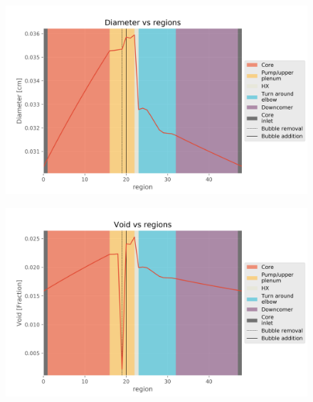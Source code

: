 \begin{figure}[ht] 
\centering
\begin{minipage}{.5\textwidth}
  \centering
  \includegraphics[width=1.0\linewidth]{images/BaseCaseDiameter.png}
  \label{fig:BaseCaseDia}
\end{minipage}%
\begin{minipage}{.5\textwidth}
  \centering
  \includegraphics[width=1.0\linewidth]{images/BaseCaseVoid.png}
  \label{fig:BaseCaseVoid}
\end{minipage}
\end{figure}

